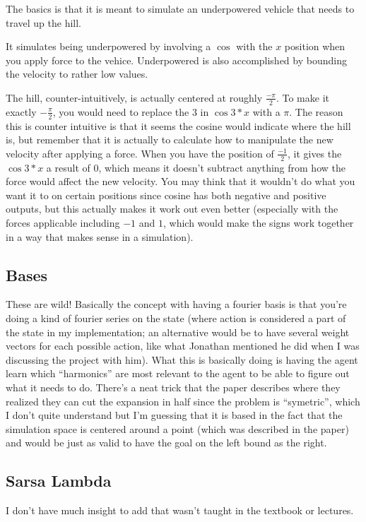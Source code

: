 \documentclass{article}
\begin{document}
The basics is that it is meant to simulate an underpowered vehicle that needs to travel up the hill.

It simulates being underpowered by involving a $ \cos $ with the $ x $ position when you apply force to the vehice.
Underpowered is also accomplished by bounding the velocity to rather low values. 

The hill, counter-intuitively, is actually centered at roughly $ \frac{-\pi}{2}
$. To make it exactly $ - \frac{\pi}{2} $, you would need to replace the $ 3 $ in $
\cos 3 * x $ with a  $ \pi $. The reason this is counter intuitive is that it seems the cosine would
indicate where the hill is, but remember that it is actually to calculate how to manipulate the 
new velocity after applying a force. When you have the position of $ \frac{-1}{2} $, it gives the 
$ \cos{3 * x} $ a result of $ 0 $, which means it doesn't subtract anything from how the force would
affect the new velocity. You may think that it wouldn't do what you want it to
on certain positions since cosine has both negative and positive outputs, but
this actually makes it work out even better (especially with the forces
applicable including $ -1 $ and $ 1 $, which would make the signs work together
in a way that makes sense in a simulation).

\subsection{Bases}
These are wild! Basically the concept with having a fourier basis is that you're doing a kind of
fourier series on the state (where action is considered a part of the state in my implementation; an alternative
would be to have several weight vectors for each possible action, like what
Jonathan mentioned he did when I was discussing the project with him). What
this is basically doing is having the agent learn which ``harmonics'' are most
relevant to the agent to be able to figure out what it needs to do. There's a
neat trick that the paper describes where they realized they can cut the
expansion in half since the problem is ``symetric'', which I don't quite
understand but I'm guessing that it is based in the fact that the simulation
space is centered around a point (which was described in the paper) and would be just as valid to have
the goal on the left bound as the right. 

\subsection{Sarsa Lambda}
I don't have much insight to add that wasn't taught in the textbook or lectures. 
\end{document}
